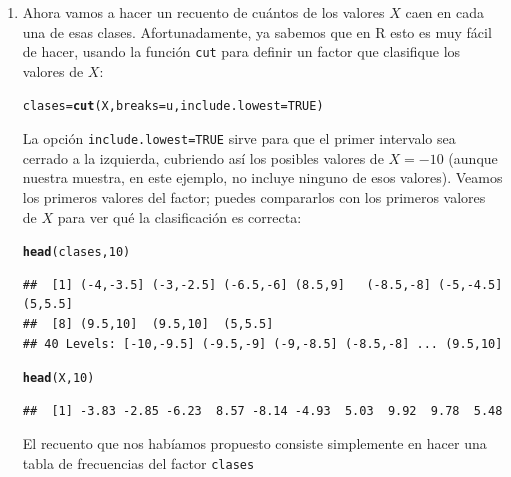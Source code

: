 \documentclass[10pt,a4paper]{article}\usepackage[]{graphicx}\usepackage[]{color}
\makeatletter
\newcommand{\hlnum}[1]{\textcolor[rgb]{0.686,0.059,0.569}{#1}}%
\newcommand{\hlstd}[1]{\textcolor[rgb]{0.345,0.345,0.345}{#1}}%
\newcommand{\hlkwb}[1]{\textcolor[rgb]{0.69,0.353,0.396}{#1}}%
\newcommand{\hlkwc}[1]{\textcolor[rgb]{0.333,0.667,0.333}{#1}}%
\newcommand{\hlkwd}[1]{\textcolor[rgb]{0.737,0.353,0.396}{\textbf{#1}}}%
\newenvironment{kframe}{%
 \def\at@end@of@kframe{}%
 \ifinner\ifhmode%
  \def\at@end@of@kframe{\end{minipage}}%
  \begin{minipage}{\columnwidth}%
 \fi\fi%
 \def\FrameCommand##1{\hskip\@totalleftmargin \hskip-\fboxsep
 \colorbox{shadecolor}{##1}\hskip-\fboxsep
     \hskip-\linewidth \hskip-\@totalleftmargin \hskip\columnwidth}%
 \MakeFramed {\advance\hsize-\width
   \@totalleftmargin\z@ \linewidth\hsize
   \@setminipage}}%
 {\par\unskip\endMakeFramed%
 \at@end@of@kframe}
\newenvironment{knitrout}{}{} %
\makeatother
\begin{document}
\begin{enumerate}
\item Ahora vamos a hacer un recuento de cuántos de los valores $X$ caen en cada una de esas clases. Afortunadamente, ya sabemos que en R esto es muy fácil de hacer, usando la función {\tt cut} para definir un factor que clasifique los valores de $X$:

\begin{knitrout}
\color{fgcolor}\begin{kframe}
\begin{alltt}
\hlstd{clases} \hlkwb{=} \hlkwd{cut}\hlstd{(X,} \hlkwc{breaks}\hlstd{=u,} \hlkwc{include.lowest}\hlstd{=}\hlnum{TRUE}\hlstd{)}
\end{alltt}
\end{kframe}
\end{knitrout}
La opción {\tt include.lowest=TRUE} sirve para que el primer intervalo sea cerrado a la izquierda, cubriendo así los posibles valores de $X=-10$ (aunque nuestra muestra, en este ejemplo, no incluye ninguno de esos valores). Veamos los primeros valores del factor; puedes compararlos con los primeros valores de $X$ para ver qué la clasificación es correcta:
\begin{knitrout}
\color{fgcolor}\begin{kframe}
\begin{alltt}
\hlkwd{head}\hlstd{(clases,} \hlnum{10}\hlstd{)}
\end{alltt}
\begin{verbatim}
##  [1] (-4,-3.5] (-3,-2.5] (-6.5,-6] (8.5,9]   (-8.5,-8] (-5,-4.5] (5,5.5]  
##  [8] (9.5,10]  (9.5,10]  (5,5.5]  
## 40 Levels: [-10,-9.5] (-9.5,-9] (-9,-8.5] (-8.5,-8] ... (9.5,10]
\end{verbatim}
\begin{alltt}
\hlkwd{head}\hlstd{(X,} \hlnum{10}\hlstd{)}
\end{alltt}
\begin{verbatim}
##  [1] -3.83 -2.85 -6.23  8.57 -8.14 -4.93  5.03  9.92  9.78  5.48
\end{verbatim}
\end{kframe}
\end{knitrout}
El recuento que nos habíamos propuesto consiste simplemente en hacer una tabla de frecuencias del factor {\tt clases}
\begin{knitrout}
\color{fgcolor}\begin{kframe}
\begin{alltt}

\end{alltt}
\end{kframe}
\end{knitrout}
\end{enumerate}
\end{document}

